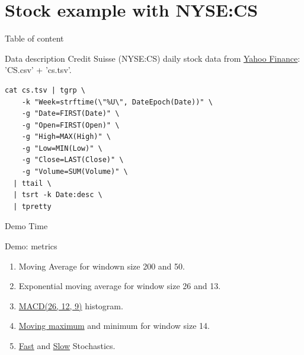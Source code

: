 \documentclass[unicode, notheorems, aspectratio=169]{beamer}
\begin{document}
\section{Stock example with NYSE:CS}
\begin{frame}{Table of content}
	\tableofcontents[currentsection]
\end{frame}

\begin{frame}[fragile]{Data description}
Credit Suisse (NYSE:CS) daily stock data from \href{https://finance.yahoo.com/quote/CS/history?period1=800553600&period2=1508515200&interval=1d&filter=history&frequency=1d}{Yahoo Finance}: 'CS.csv' + 'cs.tsv'.
\vfill
\begin{verbatim}
cat cs.tsv | tgrp \
    -k "Week=strftime(\"%U\", DateEpoch(Date))" \
    -g "Date=FIRST(Date)" \
    -g "Open=FIRST(Open)" \
    -g "High=MAX(High)" \
    -g "Low=MIN(Low)" \
    -g "Close=LAST(Close)" \
    -g "Volume=SUM(Volume)" \
  | ttail \
  | tsrt -k Date:desc \
  | tpretty
\end{verbatim}
\end{frame}

\begin{frame}[noframenumbering]
	\begin{center}
		{\huge Demo Time}
	\end{center}
\end{frame}

\begin{frame}{Demo: metrics}
\begin{enumerate}
\item Moving Average for windown size 200 and 50.
\item Exponential moving average for window size 26 and 13.
\item \href{https://en.wikipedia.org/wiki/MACD}{MACD(26, 12, 9)} histogram.
\item \href{https://www.quora.com/How-can-I-solve-this-array-moving-window-max-problem-in-linear-time}{Moving maximum} and minimum for window size 14.
\item \href{https://www.fidelity.com/learning-center/trading-investing/technical-analysis/technical-indicator-guide/fast-stochastic}{Fast} and \href{https://www.fidelity.com/learning-center/trading-investing/technical-analysis/technical-indicator-guide/slow-stochastic}{Slow} Stochastics.
\end{enumerate}
\end{frame}
\end{document}

